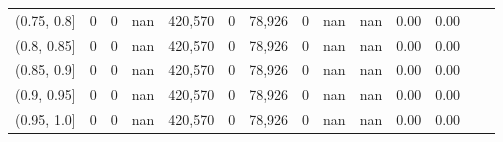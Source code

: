 \begin{tabular}{rrrrrrrrrrrrrr}
(0.75, 0.8]    &        0 &       0 &   nan &  420,570 &        0 &  78,926 &       0 &   nan &   nan &  0.00 &      0.00 \\
(0.8, 0.85]    &        0 &       0 &   nan &  420,570 &        0 &  78,926 &       0 &   nan &   nan &  0.00 &      0.00 \\
(0.85, 0.9]    &        0 &       0 &   nan &  420,570 &        0 &  78,926 &       0 &   nan &   nan &  0.00 &      0.00 \\
(0.9, 0.95]    &        0 &       0 &   nan &  420,570 &        0 &  78,926 &       0 &   nan &   nan &  0.00 &      0.00 \\
(0.95, 1.0]    &        0 &       0 &   nan &  420,570 &        0 &  78,926 &       0 &   nan &   nan &  0.00 &      0.00 \\
\bottomrule
\end{tabular}
